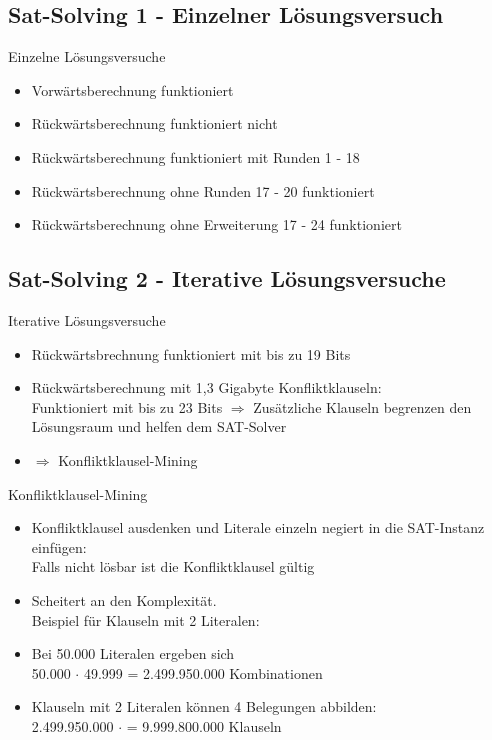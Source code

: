\documentclass{beamer}
\begin{document}
  \subsection{Sat-Solving 1 - Einzelner Lösungsversuch}
    \begin{frame}{Einzelne Lösungsversuche}
      \begin{itemize}
        \setlength{\itemsep}{20pt}
        \item Vorwärtsberechnung funktioniert
        \pause
        \item Rückwärtsberechnung funktioniert nicht
        \pause
        \item Rückwärtsberechnung funktioniert mit Runden 1 - 18
        \pause
        \item Rückwärtsberechnung ohne Runden 17 - 20 funktioniert
        \pause
        \item Rückwärtsberechnung ohne Erweiterung 17 - 24 funktioniert
      \end{itemize}
    \end{frame}
  \subsection{Sat-Solving 2 - Iterative Lösungsversuche}
    \begin{frame}{Iterative Lösungsversuche}
      \begin{itemize}
        \setlength{\itemsep}{20pt}
        \item Rückwärtsbrechnung funktioniert mit bis zu 19 Bits
        \pause
        \item Rückwärtsberechnung mit 1,3 Gigabyte Konfliktklauseln:\\ Funktioniert mit bis zu 23 Bits
        \pause
        $ \Rightarrow $ Zusätzliche Klauseln begrenzen den Lösungsraum und helfen dem SAT-Solver
        \pause
        \item $ \Rightarrow $ Konfliktklausel-Mining
      \end{itemize}
    \end{frame}
    \begin{frame}{Konfliktklausel-Mining}
      \begin{itemize}
       \item Konfliktklausel ausdenken und Literale einzeln negiert in die SAT-Instanz einfügen:\\Falls nicht lösbar ist die Konfliktklausel gültig
       \pause
       \item Scheitert an den Komplexität.\\Beispiel für Klauseln mit 2 Literalen:
       \item Bei 50.000 Literalen ergeben sich\\ 50.000 $ \cdot $ 49.999 = 2.499.950.000 Kombinationen
       \item Klauseln mit 2 Literalen können 4 Belegungen abbilden:\\ 2.499.950.000 $ \cdot $ = 9.999.800.000 Klauseln
      \end{itemize}
    \end{frame}
\end{document}
